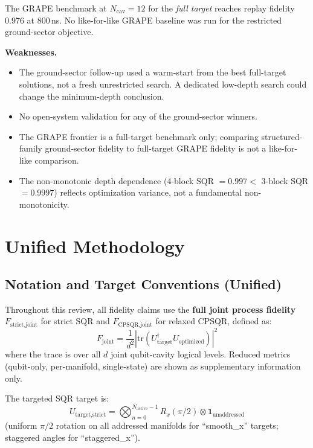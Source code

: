 \documentclass[11pt,letterpaper]{article}
\newcommand{\nact}{N_{\text{active}}}
\begin{document}
The GRAPE benchmark at $N_\text{cav} = 12$ for the \emph{full target} reaches
replay fidelity 0.976 at 800\,ns.  No like-for-like GRAPE baseline was run
for the restricted ground-sector objective.

\textbf{Weaknesses.}
\begin{itemize}
\item The ground-sector follow-up used a warm-start from the best full-target solutions,
  not a fresh unrestricted search.  A dedicated low-depth search could change the
  minimum-depth conclusion.
\item No open-system validation for any of the ground-sector winners.
\item The GRAPE frontier is a full-target benchmark only; comparing structured-family
  ground-sector fidelity to full-target GRAPE fidelity is not a like-for-like comparison.
\item The non-monotonic depth dependence (4-block SQR $= 0.997 <$ 3-block SQR $= 0.9997$)
  reflects optimization variance, not a fundamental non-monotonicity.
\end{itemize}

\section{Unified Methodology}

\subsection{Notation and Target Conventions (Unified)}

Throughout this review, all fidelity claims use the \textbf{full joint process fidelity}
$F_\text{strict,joint}$ for strict SQR and $F_\text{CPSQR,joint}$ for relaxed CPSQR,
defined as:
\begin{equation}
  F_\text{joint} = \frac{1}{d^2} \left\vert \text{tr}\left(U_\text{target}^\dagger
  U_\text{optimized}\right)\right\vert^2
\end{equation}
where the trace is over all $d$ joint qubit-cavity logical levels.
Reduced metrics (qubit-only, per-manifold, single-state) are shown as supplementary
information only.

The targeted SQR target is:
\begin{equation}
  U_\text{target,strict} = \bigotimes_{n=0}^{\nact-1} R_x(\pi/2) \otimes \mathbf{1}_\text{unaddressed}
\end{equation}
(uniform $\pi/2$ rotation on all addressed manifolds for ``smooth\_x'' targets;
staggered angles for ``staggered\_x'').
\end{document}
